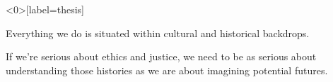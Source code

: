 \documentclass[presentation]{subfiles}
\begin{document}
\begin{frame}<0>[label=thesis] %
  \begin{center}
    \alert<+>{}
    Everything we do is situated within cultural and historical backdrops.

    If we're serious about ethics and justice, we need to be as serious
    about \alert<+>{understanding those histories}
    as we are
    about \alert<+>{imagining potential futures}.

    \vspace{2em}




  \end{center}
\end{frame}










\end{document}
